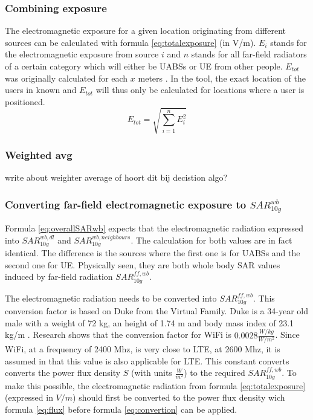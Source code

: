 \subsubsection{Combining exposure}
The electromagnetic exposure for a given location originating from different sources can be calculated with formula \ref{eq:totalexposure} (in V/m). $E_i$ stands for 
the electromagnetic exposure from source $i$ and
$n$ stands for all far-field radiators of a certain category which will either be \gls{UABS}s or \gls{UE} from other people.
$E_{tot}$ was originally calculated for each $x$ meters \cite{J1}. In the tool, the exact location of the users in known and $E_{tot}$ will thus 
only be calculated for locations where a user is positioned.
\begin{equation}
E_{tot} = \sqrt{\sum_{i=1}^{n} E_i^2}
\label{eq:totalexposure}
\end{equation}

\subsubsection{Weighted avg}
write about weighter average of hoort dit bij decistion algo?

\subsubsection{Converting far-field electromagnetic exposure to $SAR^{wb}_{10g}$}
\label{sub:convertDLtosarwb}

Formula \ref{eq:overallSARwb} expects that the electromagnetic radiation expressed into $SAR^{wb,dl}_{10g}$ and $SAR^{wb,neighbours}_{10g}$. The 
calculation for both values are in fact identical. The difference is the sources where the first one is for \gls{UABS}s and the second one for \gls{UE}.
Physically seen, they are both whole body SAR values induced by far-field radiation $SAR^{ff,wb}_{10g}$.

The electromagnetic radiation needs to be converted into $SAR^{ff,wb}_{10g}$. 
This conversion factor is based on Duke from the Virtual Family. Duke is a 34-year old male with  a weight of 72 kg, an height of 1.74 m and body
mass index of 23.1 kg/m \cite{J22_plets2015joint}. Research shows that the conversion factor for WiFi is $0.0028 \frac{W/kg}{W/m^2}$.
 Since WiFi, at a frequency of 2400 Mhz,
is very close to LTE, at 2600 Mhz, it is assumed in \cite{J22_plets2015joint} that this value is also applicable for \gls{LTE}.
This constant converts converts the \gls{power flux density} $S$ (with units $\frac{W}{m^2}$) to the required $SAR^{ff,wb}_{10g}$.
To make this possible, the electromagnetic radiation
from formula \ref{eq:totalexposure} (expressed in  $V/m$) should first be converted to the  \gls{power flux density} wich formula 
\ref{eq:flux} before formula \ref{eq:convertion} can be applied.

